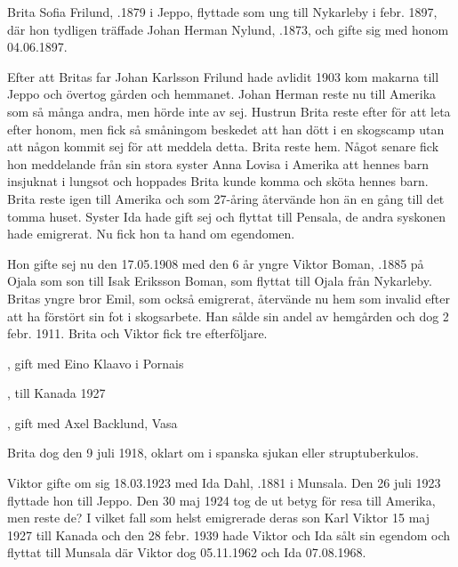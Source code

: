 Brita Sofia Frilund, .1879 i Jeppo, flyttade som ung  till Nykarleby i febr. 1897, där hon tydligen träffade Johan Herman Nylund, .1873, och gifte sig med honom 04.06.1897.

Efter att Britas far Johan Karlsson Frilund hade avlidit 1903 kom makarna till Jeppo och övertog gården och hemmanet. Johan Herman reste nu till Amerika som så många andra, men hörde inte av sej. Hustrun Brita reste efter för att leta efter honom, men fick så  småningom beskedet att han dött i en skogscamp utan att någon kommit sej för att meddela detta. Brita reste hem. Något senare fick hon meddelande från sin stora syster Anna Lovisa i Amerika att hennes barn insjuknat i lungsot och hoppades Brita kunde komma och sköta hennes barn. Brita reste igen till Amerika och som 27-åring återvände hon än en gång till det tomma huset. Syster Ida hade gift sej och flyttat till Pensala, de andra syskonen hade emigrerat. Nu fick hon ta hand om egendomen.


Hon gifte sej nu den 17.05.1908 med den 6 år yngre Viktor Boman, .1885 på Ojala som son till Isak Eriksson Boman, som flyttat till Ojala från Nykarleby. Britas yngre bror Emil, som också emigrerat, återvände nu hem som invalid efter att ha förstört sin fot i skogsarbete. Han sålde sin andel av hemgården och dog 2 febr. 1911. Brita och Viktor fick tre efterföljare.
\begin{jhchildren}
  \item {}, gift med Eino Klaavo i Pornais
  \item {}, till Kanada 1927
  \item {}, gift med Axel Backlund, Vasa
\end{jhchildren}

Brita dog den 9 juli 1918, oklart om i spanska sjukan eller struptuberkulos.


Viktor gifte om sig 18.03.1923 med Ida Dahl, .1881 i Munsala. Den 26 juli 1923 flyttade hon till Jeppo. Den 30 maj 1924 tog de ut betyg för resa till Amerika, men reste de? I vilket fall som helst emigrerade deras son Karl Viktor 15 maj 1927 till Kanada och den 28 febr. 1939 hade Viktor och Ida sålt sin egendom och flyttat till Munsala där Viktor dog 05.11.1962 och Ida 07.08.1968.


